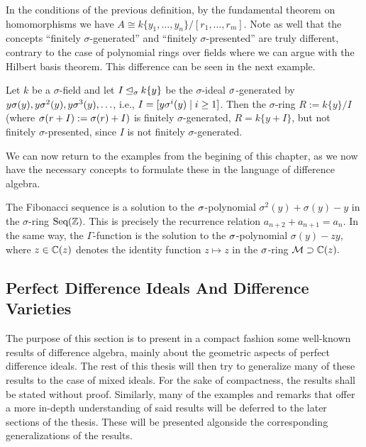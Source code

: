 \begin{rem}
In the conditions of the previous definition, by the fundamental theorem on homomorphisms we have $A \cong k\{y_1, \ldots, y_n\}/[r_1,\ldots,r_m]$. Note as well that the concepts ``finitely $\sigma$-generated'' and ``finitely $\sigma$-presented'' are truly different, contrary to the case of polynomial rings over fields where we can argue with the Hilbert basis theorem. This difference can be seen in the next example.
\end{rem}

\begin{ex}
Let $k$ be a $\sigma$-field and let $I \unlhd_{\sigma} k\{y\} $ be the $\sigma$-ideal $\sigma$-generated by $y\sigma(y), y\sigma^2(y), y\sigma^3(y), \ldots$, i.e., $I = [y \sigma^i(y) \mid i\geq 1]$. Then the $\sigma$-ring $R := k\{y\}/I$ (where $\sigma (r + I) := \sigma(r) + I)$ is 
finitely $\sigma$-generated, $R = k\{ y + I \}$, but not finitely $\sigma$-presented, since $I$ is not finitely $\sigma$-generated.
\end{ex}


We can now return to the examples from the begining of this chapter, as we now have the necessary concepts to formulate these in the language of difference algebra. 

\begin{ex}
The Fibonacci sequence is a solution to the $\sigma$-polynomial $\sigma^2(y) + \sigma(y) - y$ in the $\sigma$-ring  $\text{Seq}(\mathbb{Z})$. This is precisely the recurrence relation $a_{n+2} + a_{n+1} = a_n$.
In the same way, the $\Gamma$-function is the solution to the $\sigma$-polynomial $\sigma(y) - zy$, where $z \in \mathbb{C}(z)$ denotes the identity function $z \mapsto z$ in the $\sigma$-ring $\mathcal{M} \supset \mathbb{C}(z).$
\end{ex}

\subsection{Perfect Difference Ideals And Difference Varieties}

The purpose of this section is to present in a compact fashion some well-known results of difference algebra, mainly about the geometric aspects of perfect difference ideals. 
The rest of this thesis will then try to generalize many of these results to the case of mixed ideals. For the sake of compactness, the results shall be stated without proof.
Similarly, many of the examples and remarks that offer a more in-depth understanding of said results will be deferred to the later sections of the thesis. 
These will be presented algonside the corresponding generalizations of the results.

